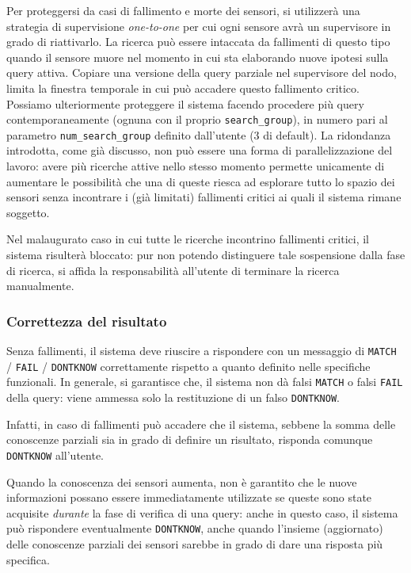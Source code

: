 \documentclass{llncs}
\begin{document}
Per proteggersi da casi di fallimento e morte dei sensori,
si utilizzerà una strategia di supervisione \emph{one-to-one}
per cui ogni sensore avrà un supervisore in grado di riattivarlo.
La ricerca può essere intaccata da fallimenti di questo tipo
quando il sensore muore nel momento in cui sta elaborando
nuove ipotesi sulla query attiva.
Copiare una versione della query parziale nel supervisore del nodo,
limita la finestra temporale in cui può accadere questo fallimento
critico.
Possiamo ulteriormente proteggere il sistema facendo procedere
più query contemporaneamente (ognuna con il proprio \texttt{search\_group}),
in numero pari al parametro \texttt{num\_search\_group}
definito dall'utente (3 di default).
La ridondanza introdotta, come già discusso,
non può essere una forma di parallelizzazione del lavoro: avere
più ricerche attive nello stesso momento permette unicamente di
aumentare le possibilità che una di queste riesca ad esplorare
tutto lo spazio dei sensori senza incontrare i (già limitati)
fallimenti critici ai quali il sistema rimane soggetto.

Nel malaugurato caso in cui tutte le ricerche incontrino
fallimenti critici, il sistema risulterà bloccato: pur non potendo
distinguere tale sospensione dalla fase di ricerca, si affida
la responsabilità all'utente di terminare la ricerca manualmente.

\subsubsection*{Correttezza del risultato}
Senza fallimenti, il sistema deve riuscire a rispondere con un messaggio di
\texttt{MATCH} / \texttt{FAIL} / \texttt{DONTKNOW} correttamente
rispetto a quanto definito nelle specifiche funzionali.
In generale, si garantisce che,
il sistema non dà falsi \texttt{MATCH} o falsi \texttt{FAIL} della query:
viene ammessa solo la restituzione di un falso \texttt{DONTKNOW}.

Infatti,
in caso di fallimenti può accadere che il sistema, sebbene la somma
delle conoscenze parziali sia in grado di definire un risultato,
risponda comunque \texttt{DONTKNOW} all'utente.

Quando la conoscenza dei sensori aumenta,
non è garantito che le nuove informazioni possano essere immediatamente
utilizzate se queste sono state acquisite \emph{durante} la fase di verifica
di una query: anche in questo caso, il sistema può rispondere eventualmente
\texttt{DONTKNOW}, anche quando l'insieme (aggiornato) delle conoscenze parziali
dei sensori sarebbe in grado di dare una risposta più specifica.

\end{document}
